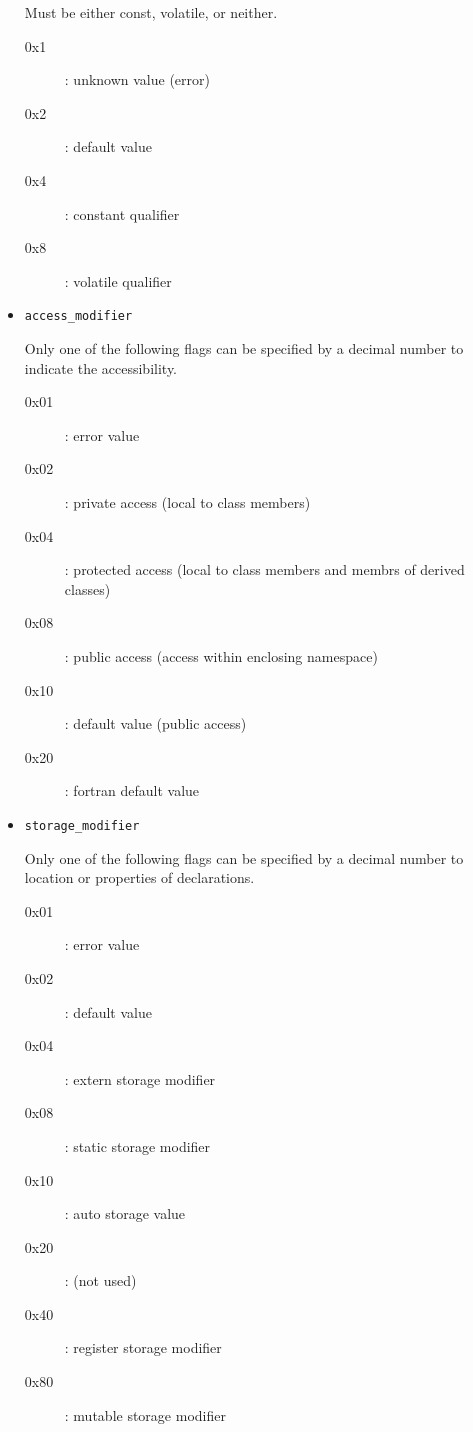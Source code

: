 \begin{itemize}
        Must be either const, volatile, or neither.
       \begin{description}
	\item[0x1]: unknown value (error)
	\item[0x2]: default value
	\item[0x4]: constant qualifier
	\item[0x8]: volatile qualifier
       \end{description}
 \item \texttt{access\_modifier}

       Only one of the following flags can be specified by a decimal
       number to indicate the accessibility.
       \begin{description}
	\item[0x01]: error value
	\item[0x02]: private access (local to class members)
	\item[0x04]: protected access (local to class members and membrs of derived classes)
	\item[0x08]: public access (access within enclosing namespace)
	\item[0x10]: default value (public access)
	\item[0x20]: fortran default value
       \end{description}
 \item \texttt{storage\_modifier}

       Only one of the following flags can be specified by a decimal
       number to location or properties of declarations.
       \begin{description}
	\item[0x01]: error value
	\item[0x02]: default value
	\item[0x04]: extern storage modifier
	\item[0x08]: static storage modifier
	\item[0x10]: auto storage value
	\item[0x20]: (not used)
	\item[0x40]: register storage modifier
	\item[0x80]: mutable storage modifier
       \end{description}
\end{itemize}

